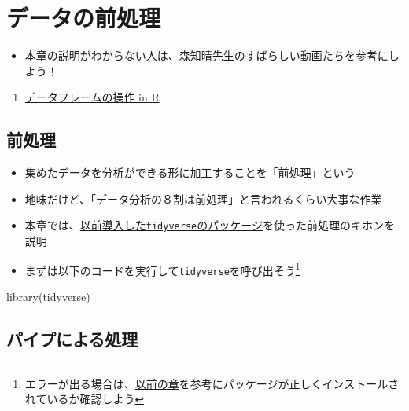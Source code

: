 \documentclass[
]{book}
\newenvironment{Shaded}{\begin{snugshade}}{\end{snugshade}}
\newcommand{\FunctionTok}[1]{\textcolor[rgb]{0.00,0.00,0.00}{#1}}
\newcommand{\NormalTok}[1]{#1}
\providecommand{\tightlist}{%
  \setlength{\itemsep}{0pt}\setlength{\parskip}{0pt}}
\begin{document}
\hypertarget{ux30c7ux30fcux30bfux306eux524dux51e6ux7406}{%
\chapter{データの前処理}\label{ux30c7ux30fcux30bfux306eux524dux51e6ux7406}}

\begin{itemize}
\tightlist
\item
  本章の説明がわからない人は、森知晴先生のすばらしい動画たちを参考にしよう！
\end{itemize}

\begin{enumerate}
\def\labelenumi{\arabic{enumi}.}
\tightlist
\item
  \href{https://youtu.be/96AZJmGNass}{データフレームの操作 in R}
\end{enumerate}

\hypertarget{ux524dux51e6ux7406}{%
\section{前処理}\label{ux524dux51e6ux7406}}

\begin{itemize}
\tightlist
\item
  集めたデータを分析ができる形に加工することを「前処理」という
\item
  地味だけど、「データ分析の８割は前処理」と言われるくらい大事な作業
\item
  本章では、\protect\hyperlink{ux30d1ux30c3ux30b1ux30fcux30b8ux306eux30a4ux30f3ux30b9ux30c8ux30fcux30eb}{以前導入した\texttt{tidyverse}のパッケージ}を使った前処理のキホンを説明
\item
  まずは以下のコードを実行して\texttt{tidyverse}を呼び出そう\footnote{エラーが出る場合は、\protect\hyperlink{ux30d1ux30c3ux30b1ux30fcux30b8ux306eux30a4ux30f3ux30b9ux30c8ux30fcux30eb}{以前の章}を参考にパッケージが正しくインストールされているか確認しよう}
\end{itemize}

\begin{Shaded}
\begin{Highlighting}[]
\FunctionTok{library}\NormalTok{(tidyverse)}
\end{Highlighting}
\end{Shaded}

\hypertarget{ux30d1ux30a4ux30d7ux306bux3088ux308bux51e6ux7406}{%
\section{パイプによる処理}\label{ux30d1ux30a4ux30d7ux306bux3088ux308bux51e6ux7406}}
\end{document}
